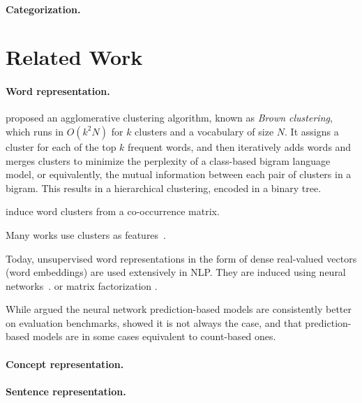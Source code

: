\documentclass{article}
\begin{document}
    \paragraph{Categorization.}


    \section{Related Work}\label{sec:related_work}

    \paragraph{Word representation.}
    \citet{brown1992class} proposed an agglomerative clustering algorithm,
    known as \textit{Brown clustering},
    which runs in $O(k^2N)$ for $k$ clusters and a vocabulary of size $N$.
    It assigns a cluster for each of the top $k$ frequent words,
    and then iteratively adds words and merges clusters to minimize the
    perplexity of a class-based bigram language model,
    or equivalently, the mutual information between each pair of clusters in a bigram.
    This results in a hierarchical clustering, encoded in a binary tree.

    \citet{pereira1993distributional} induce word clusters from a co-occurrence matrix.

    Many works use clusters as features~\cite{miller2004name,koo2008simple,huang2009distributional,zhao2009multilingual}.

    Today, unsupervised word representations in the form of dense real-valued vectors
    (word embeddings) are used extensively in NLP.
    They are induced using neural networks~\cite{bengio2003neural,mnih2007three,collobert2008unified,turian2010word,mikolov2013efficient}.
    or matrix factorization \cite{pennington2014glove}.
    
    While \citet{baroni2014don} argued the neural network prediction-based models are
consistently better on evaluation benchmarks, \citet{levy2015improving} showed
it is not always the case, and that prediction-based models are in some cases
equivalent to count-based ones.

    \paragraph{Concept representation.}


    \paragraph{Sentence representation.}


    
    
\end{document}
